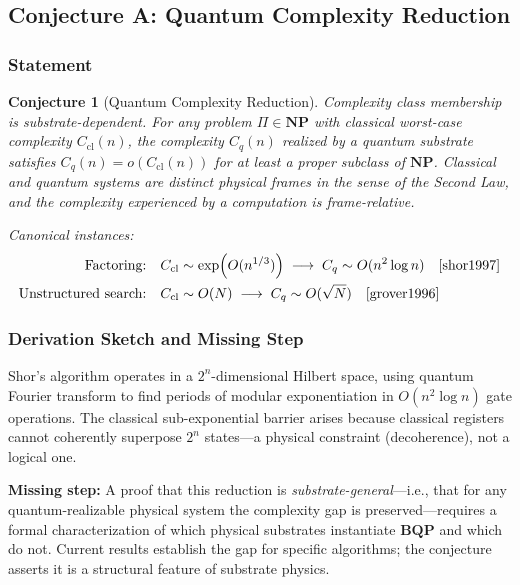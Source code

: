 \documentclass[12pt]{article}
\theoremstyle{lawstyle}
\theoremstyle{conjstyle}
\newtheorem{conjecture}{Conjecture}[section]
\theoremstyle{predstyle}
\begin{document}
\subsection{Conjecture A: Quantum Complexity Reduction}

\subsubsection*{Statement}

\begin{conjecture}[Quantum Complexity Reduction]
Complexity class membership is substrate-dependent. For any problem $\Pi \in \mathbf{NP}$
with classical worst-case complexity $C_{\mathrm{cl}}(n)$, the complexity $C_q(n)$ realized
by a quantum substrate satisfies $C_q(n) = o(C_{\mathrm{cl}}(n))$ for at least a proper
subclass of $\mathbf{NP}$. Classical and quantum systems are distinct physical frames in the
sense of the Second Law, and the complexity experienced by a computation is frame-relative.

\begin{conjbox}
Canonical instances:
\begin{align*}
  \text{Factoring:} &\quad C_{\mathrm{cl}} \sim \exp\!\left(O(n^{1/3})\right)
    \;\longrightarrow\; C_q \sim O(n^2 \log n) \quad \text{\cite{shor1997}}\\
  \text{Unstructured search:} &\quad C_{\mathrm{cl}} \sim O(N)
    \;\longrightarrow\; C_q \sim O(\sqrt{N}) \quad \text{\cite{grover1996}}
\end{align*}
\end{conjbox}
\end{conjecture}

\subsubsection*{Derivation Sketch and Missing Step}

Shor's algorithm operates in a $2^n$-dimensional Hilbert space, using quantum Fourier
transform to find periods of modular exponentiation in $O(n^2 \log n)$ gate operations. The
classical sub-exponential barrier arises because classical registers cannot coherently
superpose $2^n$ states---a physical constraint (decoherence), not a logical one.

\textbf{Missing step:} A proof that this reduction is \emph{substrate-general}---i.e., that
for any quantum-realizable physical system the complexity gap is preserved---requires a
formal characterization of which physical substrates instantiate $\mathbf{BQP}$ and which do
not. Current results establish the gap for specific algorithms; the conjecture asserts it is
a structural feature of substrate physics.
\end{document}
